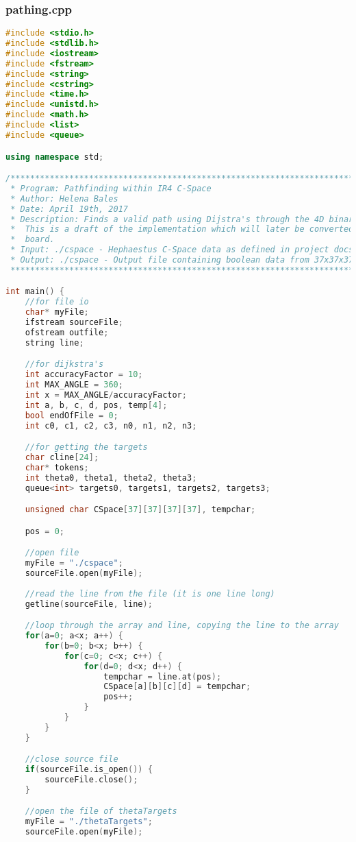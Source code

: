 \subsubsection{pathing.cpp}
\begin{lstlisting}[language=C++]
#include <stdio.h>
#include <stdlib.h>
#include <iostream>
#include <fstream>
#include <string>
#include <cstring>
#include <time.h>
#include <unistd.h>
#include <math.h>
#include <list>
#include <queue>

using namespace std;

/*****************************************************************************
 * Program: Pathfinding within IR4 C-Space
 * Author: Helena Bales
 * Date: April 19th, 2017
 * Description: Finds a valid path using Dijstra's through the 4D binary array located in cspace. 
 * 	This is a draft of the implementation which will later be converted to run on the AVR 
 * 	board.
 * Input: ./cspace - Hephaestus C-Space data as defined in project docs
 * Output: ./cspace - Output file containing boolean data from 37x37x37x37 array
 *****************************************************************************/

int main() {
	//for file io
	char* myFile;
	ifstream sourceFile;
	ofstream outfile;
	string line;

	//for dijkstra's
	int accuracyFactor = 10;
	int MAX_ANGLE = 360;
	int x = MAX_ANGLE/accuracyFactor;
	int a, b, c, d, pos, temp[4];
	bool endOfFile = 0;
	int c0, c1, c2, c3, n0, n1, n2, n3;

	//for getting the targets
	char cline[24];
	char* tokens;
	int theta0, theta1, theta2, theta3;
	queue<int> targets0, targets1, targets2, targets3;

	unsigned char CSpace[37][37][37][37], tempchar;

	pos = 0;

	//open file
	myFile = "./cspace";
	sourceFile.open(myFile);
	
	//read the line from the file (it is one line long)
	getline(sourceFile, line);

	//loop through the array and line, copying the line to the array
	for(a=0; a<x; a++) {
		for(b=0; b<x; b++) {
			for(c=0; c<x; c++) {
				for(d=0; d<x; d++) {
					tempchar = line.at(pos);
					CSpace[a][b][c][d] = tempchar;
					pos++;
				}
			}
		}
	}

	//close source file
	if(sourceFile.is_open()) {
		sourceFile.close();
	}

	//open the file of thetaTargets
	myFile = "./thetaTargets";
	sourceFile.open(myFile);


\end{lstlisting}
